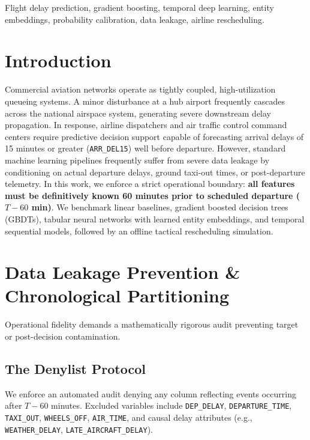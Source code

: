 \documentclass[conference]{IEEEtran}
\begin{document}
\begin{IEEEkeywords}
Flight delay prediction, gradient boosting, temporal deep learning, entity embeddings, probability calibration, data leakage, airline rescheduling.
\end{IEEEkeywords}

\section{Introduction}
Commercial aviation networks operate as tightly coupled, high-utilization queueing systems. A minor disturbance at a hub airport frequently cascades across the national airspace system, generating severe downstream delay propagation. In response, airline dispatchers and air traffic control command centers require predictive decision support capable of forecasting arrival delays of 15 minutes or greater (\texttt{ARR\_DEL15}) well before departure.
However, standard machine learning pipelines frequently suffer from severe data leakage by conditioning on actual departure delays, ground taxi-out times, or post-departure telemetry. In this work, we enforce a strict operational boundary: \textbf{all features must be definitively known 60 minutes prior to scheduled departure ($T - 60$ min)}. We benchmark linear baselines, gradient boosted decision trees (GBDTs), tabular neural networks with learned entity embeddings, and temporal sequential models, followed by an offline tactical rescheduling simulation.

\section{Data Leakage Prevention \& Chronological Partitioning}
\label{sec:data}
Operational fidelity demands a mathematically rigorous audit preventing target or post-decision contamination.
\subsection{The Denylist Protocol}
We enforce an automated audit denying any column reflecting events occurring after $T - 60$ minutes. Excluded variables include \texttt{DEP\_DELAY}, \texttt{DEPARTURE\_TIME}, \texttt{TAXI\_OUT}, \texttt{WHEELS\_OFF}, \texttt{AIR\_TIME}, and causal delay attributes (e.g., \texttt{WEATHER\_DELAY}, \texttt{LATE\_AIRCRAFT\_DELAY}).
\end{document}

